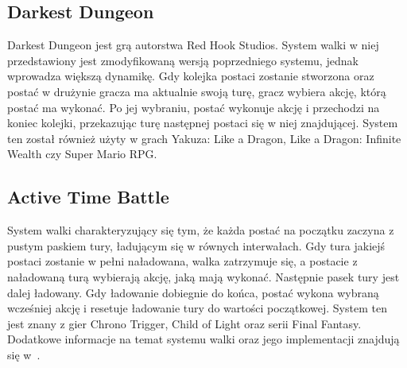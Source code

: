 \documentclass{SGGW-thesis}
\begin{document}
\subsection{Darkest Dungeon}
Darkest Dungeon jest grą autorstwa Red Hook Studios. System walki w niej przedstawiony jest zmodyfikowaną wersją poprzedniego systemu, jednak wprowadza większą dynamikę. 
Gdy kolejka postaci zostanie stworzona oraz postać w drużynie gracza ma aktualnie swoją turę, gracz wybiera akcję, 
którą postać ma wykonać. Po jej wybraniu, postać wykonuje akcję i przechodzi na koniec kolejki, przekazując turę następnej postaci się w 
niej znajdującej. System ten został również użyty w grach Yakuza: Like a Dragon, Like a Dragon: Infinite Wealth czy Super Mario RPG.
\subsection{Active Time Battle}
System walki charakteryzujący się tym, że każda postać na początku zaczyna z pustym paskiem tury, ładującym się w równych interwałach. 
Gdy tura jakiejś postaci zostanie w pełni naładowana, walka zatrzymuje się, a postacie z naładowaną turą wybierają akcję, jaką mają wykonać. 
Następnie pasek tury jest dalej ładowany. Gdy ładowanie dobiegnie do końca, postać wykona wybraną wcześniej akcję i resetuje ładowanie tury 
do wartości początkowej. System ten jest znany z gier Chrono Trigger, Child of Light oraz serii Final Fantasy. Dodatkowe informacje na temat systemu walki oraz jego implementacji znajdują się w~\cite{ATB,PlayerPreferencesInRPGs}.
\end{document}
